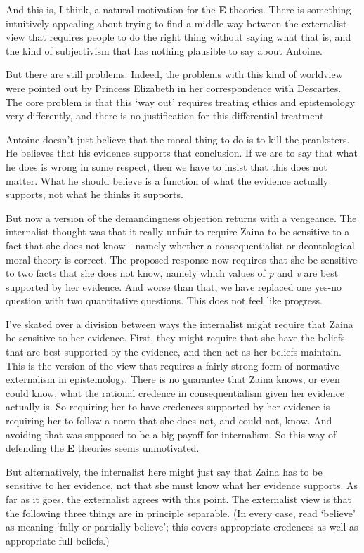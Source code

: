 \documentclass[
  10pt,
  letterpaper,
  twoside]{scrbook}
\begin{document}
And this is, I think, a natural motivation for the \textbf{E} theories.
There is something intuitively appealing about trying to find a middle
way between the externalist view that requires people to do the right
thing without saying what that is, and the kind of subjectivism that has
nothing plausible to say about {Antoine}.

But there are still problems. Indeed, the problems with this kind of
worldview were pointed out by Princess Elizabeth in her correspondence
with Descartes. The core problem is that this `way out' requires
treating ethics and epistemology very differently, and there is no
justification for this differential treatment.

{Antoine} doesn't just believe that the moral thing to do is to kill the
pranksters. He believes that his evidence supports that conclusion. If
we are to say that what he does is wrong in some respect, then we have
to insist that this does not matter. What he should believe is a
function of what the evidence actually supports, not what he thinks it
supports.

But now a version of the demandingness objection returns with a
vengeance. The internalist thought was that it really unfair to require
{Zaina} to be sensitive to a fact that she does not know - namely
whether a consequentialist or deontological moral theory is correct. The
proposed response now requires that she be sensitive to two facts that
she does not know, namely which values of \emph{p} and \emph{v} are best
supported by her evidence. And worse than that, we have replaced one
yes-no question with two quantitative questions. This does not feel like
progress.

I've skated over a division between ways the internalist might require
that {Zaina} be sensitive to her evidence. First, they might require
that she have the beliefs that are best supported by the evidence, and
then act as her beliefs maintain. This is the version of the view that
requires a fairly strong form of normative externalism in epistemology.
There is no guarantee that {Zaina} knows, or even could know, what the
rational credence in consequentialism given her evidence actually is. So
requiring her to have credences supported by her evidence is requiring
her to follow a norm that she does not, and could not, know. And
avoiding that was supposed to be a big payoff for internalism. So this
way of defending the \textbf{E} theories seems unmotivated.

But alternatively, the internalist here might just say that {Zaina} has
to be sensitive to her evidence, not that she must know what her
evidence supports. As far as it goes, the externalist agrees with this
point. The externalist view is that the following three things are in
principle separable. (In every case, read `believe' as meaning `fully or
partially believe'; this covers appropriate credences as well as
appropriate full beliefs.)
\end{document}
